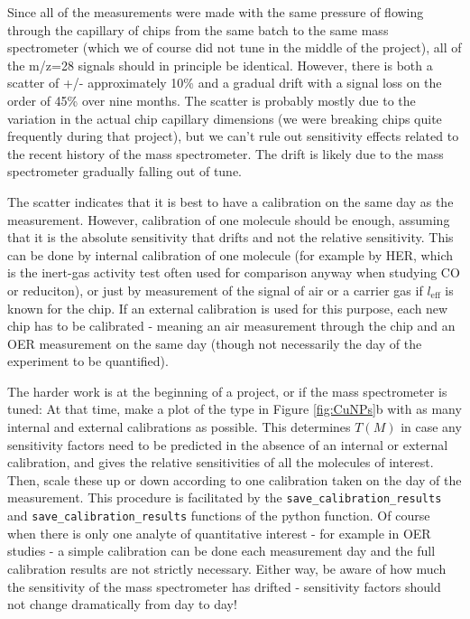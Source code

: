 Since all of the measurements were made with the same pressure of  flowing through the capillary of chips from the same batch to the same mass spectrometer (which we of course did not tune in the middle of the project), all of the m/z=28 signals should in principle be identical. However, there is both a scatter of +/- approximately 10\% and a gradual drift with a signal loss on the order of 45\% over nine months. The scatter is probably mostly due to the variation in the actual chip capillary dimensions (we were breaking chips quite frequently during that project), but we can't rule out sensitivity effects related to the recent history of the mass spectrometer. The drift is likely due to the mass spectrometer gradually falling out of tune. 

The scatter indicates that it is best to have a calibration on the same day as the measurement. However, calibration of one molecule should be enough, assuming that it is the absolute sensitivity that drifts and not the relative sensitivity. This can be done by internal calibration of one molecule (for example  by HER, which is the inert-gas activity test often used for comparison anyway when studying CO or  reduciton), or just by measurement of the signal of air or a carrier gas if $l_\text{eff}$ is known for the chip. If an external calibration is used for this purpose, each new chip has to be calibrated - meaning an air measurement through the chip and an OER measurement on the same day (though not necessarily the day of the experiment to be quantified).

The harder work is at the beginning of a project, or if the mass spectrometer is tuned: At that time, make a plot of the type in Figure \ref{fig:CuNPs}b with as many internal and external calibrations as possible. This determines $T(M)$ in case any sensitivity factors need to be predicted in the absence of an internal or external calibration, and gives the relative sensitivities of all the molecules of interest. Then, scale these up or down according to one calibration taken on the day of the measurement. This procedure is facilitated by the \texttt{save\_calibration\_results} and \texttt{save\_calibration\_results} functions of the  python function. Of course when there is only one analyte of quantitative interest - for example in OER studies - a simple calibration can be done each measurement day and the full calibration results are not strictly necessary. Either way, be aware of how much the sensitivity of the mass spectrometer has drifted - sensitivity factors should not change dramatically from day to day!


